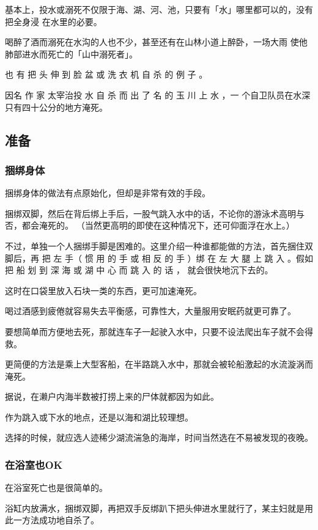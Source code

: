 \documentclass[UTF8]{ctexart}
\begin{document}
基本上，投水或溺死不仅限于海、湖、河、池，只要有「水」哪里都可以的，没有把全身浸 在水里的必要。

喝醉了酒而溺死在水沟的人也不少，甚至还有在山林小道上醉卧，一场大雨 使他肺部进水而死亡的「山中溺死者」。

也 有 把 头 伸 到 脸 盆 或 洗 衣 机 自 杀 的 例 子 。

因名 作 家 太宰治投 水 自 杀 而 出 了 名 的 玉 川 上 水 ，一 个自卫队员在水深只有四十公分的地方淹死。

\subsection{准备}

\subsubsection*{捆绑身体}

捆绑身体的做法有点原始化，但却是非常有效的手段。

捆绑双脚，然后在背后绑上手后，一股气跳入水中的话，不论你的游泳术高明与否，都会淹死的。
（当然更高明的即使在这种情况下，还可仰面浮在水上。）

不过，单独一个人捆绑手脚是困难的。这里介绍一种谁都能做的方法，首先捆住双脚后，再 把 左 手（ 惯 用 的 手 或 相 反 的 手 ）绑 在 左 大 腿 上 跳 入 。假如 把 船 划 到 深 海 或 湖 中 心 而 跳 入 的 话 ， 就会很快地沉下去的。

这时在口袋里放入石块一类的东西，更可加速淹死。 

喝过酒感到疲倦就容易失去平衡感，可靠性大，大量服用安眠药就更可靠了。

要想简单而方便地去死，那就连车子一起驶入水中，只要不设法爬出车子就不会得救。

更简便的方法是乘上大型客船，在半路跳入水中，那就会被轮船激起的水流漩涡而淹死。

据说，在濑户内海半数被打捞上来的尸体就都因为如此。

作为跳入或下水的地点，还是以海和湖比较理想。

选择的时候，就应选人迹稀少湖流湍急的海岸，时间当然选在不易被发现的夜晚。

\subsubsection*{在浴室也OK}

在浴室死亡也是很简单的。

浴缸内放满水，捆绑双脚，再把双手反绑趴下把头伸进水里就行了，某主妇就是用此一方法成功地自杀了。
\end{document}
